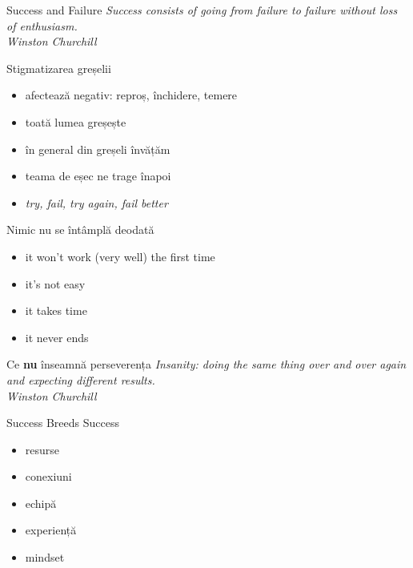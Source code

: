 \documentclass[handout]{beamer}
\begin{document}
\begin{frame}{Success and Failure}
  \centering
  \textit{Success consists of going from failure to failure without loss of enthusiasm.} \\
  \vspace{3mm}
  \hfill \textit{Winston Churchill}
\end{frame}

\begin{frame}{Stigmatizarea greșelii}
  \begin{itemize}
    \pause \item afectează negativ: reproș, închidere, temere
    \pause \item toată lumea greșește
    \pause \item în general din greșeli învățăm
    \pause \item teama de eșec ne trage înapoi
    \pause \item \textit{try, fail, try again, fail better}
  \end{itemize}
\end{frame}

\begin{frame}{Nimic nu se întâmplă deodată}
  \begin{itemize}
    \pause \item it won't work (very well) the first time
    \pause \item it's not easy
    \pause \item it takes time
    \pause \item it never ends
  \end{itemize}
\end{frame}

\begin{frame}{Ce \textbf{nu} înseamnă perseverența}
  \pause
  \centering
  \textit{Insanity: doing the same thing over and over again and expecting different results.} \\
  \vspace{3mm}
  \hfill \textit{Winston Churchill}
\end{frame}

\begin{frame}{Success Breeds Success}
  \begin{itemize}
    \pause \item resurse
    \pause \item conexiuni
    \pause \item echipă
    \pause \item experiență
    \pause \item mindset
  \end{itemize}
\end{frame}
\end{document}
